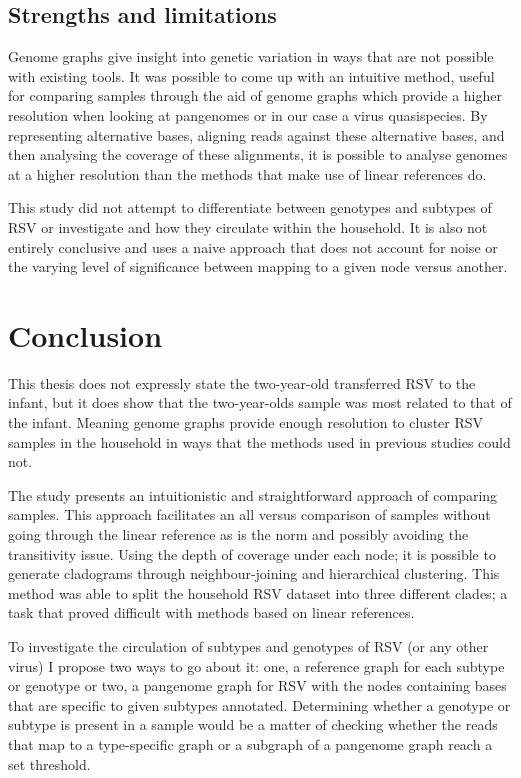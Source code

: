 \documentclass[10pt, a4paper]{article}
\begin{document}
\subsection{Strengths and limitations}
\label{sec:org716aacd}
Genome graphs give insight into genetic variation in ways that are not possible
with existing tools.
It was possible to come up with an intuitive method, useful for comparing
samples through the aid of genome graphs which provide a higher resolution when
looking at pangenomes or in our case a virus quasispecies. By representing
alternative bases, aligning reads against these alternative bases, and then
analysing the coverage of these alignments, it is possible to analyse genomes at
a higher resolution than the methods that make use of linear references do.

This study did not attempt to differentiate between genotypes and subtypes of
RSV or investigate and how they circulate within the household.
It is also not entirely conclusive and uses a naive approach that does not
account for noise or the varying level of significance between mapping to a
given node versus another.

\newpage
\section{Conclusion}
\label{sec:orgfd1d29b}
This thesis does not expressly state the two-year-old transferred RSV to the
infant, but it does show that the two-year-olds sample was most related to that
of the infant.
Meaning genome graphs provide enough resolution to cluster RSV samples in the
household in ways that the methods used in previous studies could not. 

The study presents an intuitionistic and straightforward approach of comparing
samples.
This approach facilitates an all versus comparison of samples without going
through the linear reference as is the norm and possibly avoiding the
transitivity issue.
Using the depth of coverage under each node; it is possible to generate
cladograms through neighbour-joining and hierarchical clustering.
This method was able to split the household RSV dataset into three different
clades; a task that proved difficult with methods based on linear references.

To investigate the circulation of subtypes and genotypes of RSV
(or any other virus) I propose two ways to go about it: one, a reference graph
for each subtype or genotype or two, a pangenome graph for RSV with the nodes
containing bases that are specific to given subtypes annotated.
Determining whether a genotype or subtype is present in a sample would be a
matter of checking whether the reads that map to a type-specific graph or a
subgraph of a pangenome graph reach a set threshold.
\end{document}
